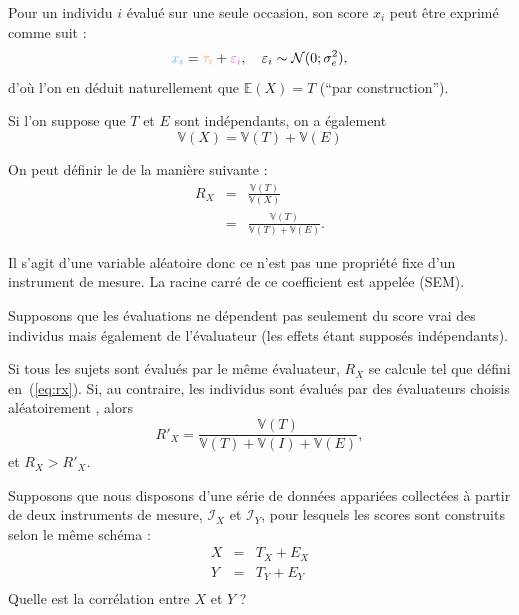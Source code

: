 Pour un individu $i$ évalué sur une seule occasion, son score $x_i$ peut être
exprimé comme suit : 
\[
\textcolor{CornflowerBlue}{x_i} = \textcolor{Apricot}{\tau_i} +
\textcolor{Thistle}{\varepsilon_i},\quad \varepsilon_i\sim\mathcal{N}(0;\sigma_e^2),
\]
d'où l'on en déduit naturellement que $\mathbb{E}(X)=T$ (\enquote{par construction}).

Si l'on suppose que $T$ et $E$ sont indépendants, on a également
\[
\mathbb{V}(X) = \mathbb{V}(T)+\mathbb{V}(E)
\]

\foilhead{}
On peut définir le  de la manière suivante :
\begin{eqnarray}\label{eq:rx}
  R_X & = & \frac{\mathbb{V}(T)}{\mathbb{V}(X)}\nonumber\\
      & = & \frac{\mathbb{V}(T)}{\mathbb{V}(T)+\mathbb{V}(E)}.
\end{eqnarray}

Il s'agit d'une variable aléatoire donc ce n'est pas une propriété fixe d'un
instrument de mesure. La racine carré de ce coefficient est appelée
 (SEM).

Supposons que les évaluations ne dépendent pas seulement du score vrai des
individus mais également de l'évaluateur (les effets étant supposés
indépendants).

Si tous les sujets sont évalués par le même évaluateur, $R_X$ se calcule tel que
défini en~(\ref{eq:rx}). Si, au contraire, les individus sont évalués par des
évaluateurs choisis aléatoirement , alors
\begin{equation}\label{eq:rxprime}
    R'_X=\frac{\mathbb{V}(T)}{\mathbb{V}(T)+\mathbb{V}(I)+\mathbb{V}(E)},
\end{equation}
et $R_X^{}>R'_X$.

Supposons que nous disposons d'une série de données appariées collectées à
partir de deux instruments de mesure, $\mathcal{I}_X$ et $\mathcal{I}_Y$, pour
lesquels les scores sont construits selon le même schéma :
\begin{eqnarray*}
	X & = & T_X+E_X\\
	Y & = & T_Y+E_Y\\
\end{eqnarray*}
Quelle est la corrélation entre $X$ et $Y$ ?

